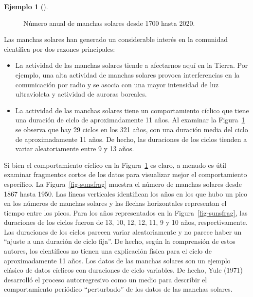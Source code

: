 \documentclass[
  us-letterpaper,
]{scrreprt}
\theoremstyle{plain}
\theoremstyle{definition}
\newtheorem{example}{Ejemplo}[chapter]
\theoremstyle{plain}
\theoremstyle{definition}
\theoremstyle{remark}
\begin{document}
\begin{example}[]
\begin{tcolorbox}
\begin{figure}[H]
{}

\caption{\label{fig-sunspot}Número anual de manchas solares desde 1700
hasta 2020.}

\end{figure}%

Las manchas solares han generado un considerable interés en la comunidad
científica por dos razones principales:

\begin{itemize}
\item
  La actividad de las manchas solares tiende a afectarnos aquí en la
  Tierra. Por ejemplo, una alta actividad de manchas solares provoca
  interferencias en la comunicación por radio y se asocia con una mayor
  intensidad de luz ultravioleta y actividad de auroras boreales.
\item
  La actividad de las manchas solares tiene un comportamiento cíclico
  que tiene una duración de ciclo de aproximadamente 11 años. Al
  examinar la Figura~\ref{fig-sunspot} se observa que hay 29 ciclos en
  los 321 años, con una duración media del ciclo de aproximadamente 11
  años. De hecho, las duraciones de los ciclos tienden a variar
  aleatoriamente entre 9 y 13 años.
\end{itemize}

Si bien el comportamiento cíclico en la Figura~\ref{fig-sunspot} es
claro, a menudo es útil examinar fragmentos cortos de los datos para
visualizar mejor el comportamiento específico. La
Figura~\ref{fig-sunsfrag} muestra el número de manchas solares desde
1867 hasta 1950. Las líneas verticales identifican los años en los que
hubo un pico en los números de manchas solares y las flechas
horizontales representan el tiempo entre los picos. Para los años
representados en la Figura~\ref{fig-sunsfrag}, las duraciones de los
ciclos fueron de 13, 10, 12, 12, 11, 9 y 10 años, respectivamente. Las
duraciones de los ciclos parecen variar aleatoriamente y no parece haber
un ``ajuste a una duración de ciclo fija''. De hecho, según la
comprensión de estos autores, los científicos no tienen una explicación
física para el ciclo de aproximadamente 11 años. Los datos de las
manchas solares son un ejemplo clásico de datos cíclicos con duraciones
de ciclo variables. De hecho, Yule (1971) desarrolló el proceso
autorregresivo como un medio para describir el comportamiento periódico
``perturbado'' de los datos de las manchas solares.

\begin{figure}[H]

\centering{

}
\end{figure}
\end{tcolorbox}
\end{example}
\end{document}
